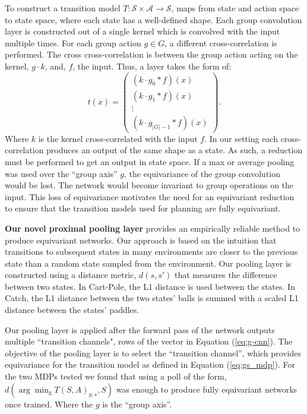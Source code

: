 \documentclass[mlabstract]{jmlr}
\begin{document}
To construct a transition model $T: \mathcal{S} \times \mathcal{A} \rightarrow \mathcal{S}$, maps from state and action space to state space, where each state has a well-defined shape. Each group convolution layer is constructed out of a single kernel which is convolved with the input multiple times. For each group action $g \in G$, a different cross-correlation is performed. The cross cross-correlation is between the group action acting on the kernel, $g\cdot k$, and, $f$, the input. Thus, a layer takes the form of:
\begin{equation}
	t(x) = \begin{pmatrix}
		(k \cdot g_0* f )(x)  \\
		(k \cdot g_1 * f )(x) \\
		\vdots                \\
		(k \cdot g_{|G|-1} * f)(x)
	\end{pmatrix}.
	\label{eq:g-cnn}
\end{equation}
Where $k$ is the kernel cross-correlated with the input $f$. In our setting each cross-correlation produces an output of the same shape as a state. As such, a reduction must be performed to get an output in state space. If a max or average pooling was used over the ``group axis'' $g$, the equivariance of the group convolution would be lost. The network would become invariant to group operations on the input. This loss of equivariance motivates the need for an equivariant reduction to ensure that the transition models used for planning are fully equivariant.

\textbf{Our novel proximal pooling layer} provides an empirically reliable method to produce equivariant networks. Our approach is based on the intuition that transitions to subsequent states in many environments are closer to the previous state than a random state sampled from the environment. Our pooling layer is constructed using a distance metric, $d(s, s')$ that measures the difference between two states. In Cart-Pole, the L1 distance is used between the states. In Catch, the L1 distance between the two states' balls is summed with a scaled L1 distance between the states' paddles.

Our pooling layer is applied after the forward pass of the network outputs multiple ``transition channels", rows of the vector in Equation (\ref{eq:g-cnn}). The objective of the pooling layer is to select the ``transition channel'', which provides equivariance for the transition model as defined in Equation (\ref{eq:gs_mdp}). For the two MDPs tested we found that using a poll of the form, $d(\arg\min_{\text{g}}T(S,A)_{g,s}, S)$ was enough to produce fully equivariant networks once trained. Where the $g$ is the ``group axis''.
\end{document}
